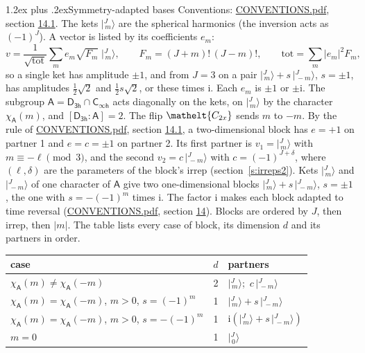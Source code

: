 \documentclass[10pt,a4paper]{article}
\makeatletter
\renewcommand\section{\@startsection{section}{1}{\z@}{-3ex plus -1ex minus -.2ex}%
  {1.2ex plus .2ex}{\normalfont\large\sffamily\bfseries\color{parttitle}}}
\numberwithin{equation}{section}
\newcommand{\eltfont}[1]{{\let\sigma\eltsigma\mathelt{#1}}}
\newcommand{\grp}[1]{\mathsf{#1}}
\newcommand{\elt}[1]{\eltfont{#1}}
\newcommand{\grpindex}[2]{[#1 : #2]}
\newcommand{\iunit}{\mathrm{i}}
\newcommand{\chiA}{\chi_{\grp{A}}}
\newcommand{\jm}[2]{\bigl\lvert{}^{#1}_{\,#2}\bigr\rangle}
\makeatother
\begin{document}
\section{Symmetry-adapted bases}\label{s:bases}
Conventions: \href{../../CONVENTIONS.pdf}{CONVENTIONS.pdf}, section \href{../../CONVENTIONS.pdf\#conv.14.1}{14.1}.
\leavevmode\label{n:index.m}\label{n:vector.ket}The kets $\jm{J}{m}$ are the spherical harmonics (the inversion acts as $(-1)^J$). \label{n:index.ketcoefficient}\label{n:vector.basis.symmetry}\label{n:index.ketweight}\label{n:index.total}A vector is listed by its coefficients $e_m$:
\begin{equation}\label{e:ket}v = \frac{1}{\sqrt{\mathrm{tot}}}\sum_m e_m\sqrt{F_m}\;\jm{J}{m},\qquad F_m = (J+m)!\,(J-m)!,\qquad \mathrm{tot} = \sum_m |e_m|^2F_m,\end{equation}
\leavevmode\label{n:index.pair.sign}so a single ket has amplitude $\pm1$, and from $J = 3$ on a pair $\jm{J}{m} + s\,\jm{J}{-m}$, $s = \pm1$, has amplitudes $\tfrac{1}{2}\sqrt{2}$ and $\tfrac{1}{2}s\sqrt{2}$, or these times $\iunit$. Each $e_m$ is $\pm1$ or $\pm\iunit$.
\leavevmode\label{n:group.A}\label{n:function.character.abelian}The subgroup $\grp{A} = \grp{D_{3h}}\cap\grp{C_{\infty h}}$ acts diagonally on the kets, on $\jm{J}{m}$ by the character $\chiA(m)$, and $\grpindex{\grp{D_{3h}}}{\grp{A}} = 2$. The flip $\elt{C_{2x}}$ sends $m$ to $-m$. \label{n:index.partner.sign}By the rule of \href{../../CONVENTIONS.pdf}{CONVENTIONS.pdf}, section \href{../../CONVENTIONS.pdf\#conv.14.1}{14.1}, a two-dimensional block has $e = +1$ on partner 1 and $e = c = \pm1$ on partner 2. Its first partner is $v_1 = \jm{J}{m}$ with $m \equiv -\ell \pmod{3}$, and the second $v_2 = c\,\jm{J}{-m}$ with $c = (-1)^{J+\delta}$, where $(\ell, \delta)$ are the parameters of the block's irrep (section~\ref{s:irreps2}). Kets $\jm{J}{m}$ and $\jm{J}{-m}$ of one character of $\grp{A}$ give two one-dimensional blocks $\jm{J}{m} + s\,\jm{J}{-m}$, $s = \pm1$, the one with $s = -(-1)^m$ times $\iunit$. The factor $\iunit$ makes each block adapted to time reversal (\href{../../CONVENTIONS.pdf}{CONVENTIONS.pdf}, section \href{../../CONVENTIONS.pdf\#conv.14}{14}). Blocks are ordered by $J$, then irrep, then $|m|$.
\leavevmode\label{n:head.case}\label{n:head.partners}The table lists every case of block, its dimension $d$ and its partners in order.
\begin{center}\begin{tabular}{@{}lrl@{}}\toprule
case & $d$ & partners\\\midrule
$\chiA(m) \ne \chiA(-m)$ & 2 & $\jm{J}{m}$;\ $c\,\jm{J}{-m}$\\
$\chiA(m) = \chiA(-m)$, $m > 0$, $s = (-1)^m$ & 1 & $\jm{J}{m} + s\,\jm{J}{-m}$\\
$\chiA(m) = \chiA(-m)$, $m > 0$, $s = -(-1)^m$ & 1 & $\iunit(\jm{J}{m} + s\,\jm{J}{-m})$\\
$m = 0$ & 1 & $\jm{J}{0}$\\
\bottomrule\end{tabular}\end{center}
\end{document}
